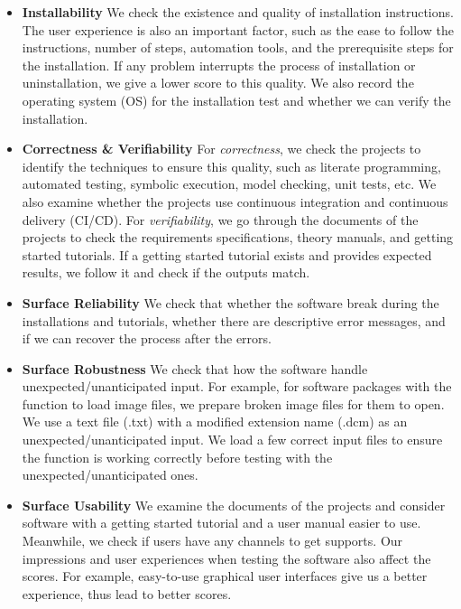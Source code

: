 \begin{itemize}
\item \textbf{Installability} We check the existence and quality of installation instructions. The user experience is also an important factor, such as the ease to follow the instructions, number of steps, automation tools, and the prerequisite steps for the installation. If any problem interrupts the process of installation or uninstallation, we give a lower score to this quality. We also record the operating system (OS) for the installation test and whether we can verify the installation.

\item \textbf{Correctness \& Verifiability} For \textit{correctness}, we check the projects to identify the techniques to ensure this quality, such as literate programming, automated testing, symbolic execution, model checking, unit tests, etc. We also examine whether the projects use continuous integration and continuous delivery (CI/CD). For \textit{verifiability}, we go through the documents of the projects to check the requirements specifications, theory manuals, and getting started tutorials. If a getting started tutorial exists and provides expected results, we follow it and check if the outputs match.

\item \textbf{Surface Reliability} We check that whether the software break during the installations and tutorials, whether there are descriptive error messages, and if we can recover the process after the errors.

\item \textbf{Surface Robustness} We check that how the software handle unexpected/unanticipated input. For example, for software packages with the function to load image files, we prepare broken image files for them to open. We use a text file (.txt) with a modified extension name (.dcm) as an unexpected/unanticipated input. We load a few correct input files to ensure the function is working correctly before testing with the unexpected/unanticipated ones.

\item \textbf{Surface Usability} We examine the documents of the projects and consider software with a getting started tutorial and a user manual easier to use. Meanwhile, we check if users have any channels to get supports. Our impressions and user experiences when testing the software also affect the scores. For example, easy-to-use graphical user interfaces give us a better experience, thus lead to better scores.


\end{itemize}
